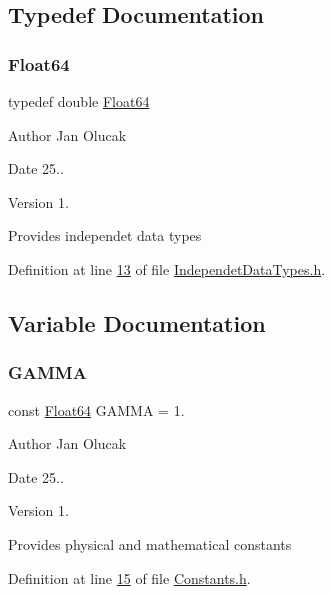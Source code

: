\subsection{Typedef Documentation}
\mbox{\label{group___tools_ga3f1431cb9f76da10f59246d1d743dc2c}} 
\subsubsection{\texorpdfstring{Float64}{Float64}}
{\footnotesize\ttfamily typedef double \hyperlink{group___tools_ga3f1431cb9f76da10f59246d1d743dc2c}{Float64}}

\begin{DoxyAuthor}{Author}
Jan Olucak 
\end{DoxyAuthor}
\begin{DoxyDate}{Date}
25.. 
\end{DoxyDate}
\begin{DoxyVersion}{Version}
1.
\end{DoxyVersion}
Provides independet data types 

Definition at line \hyperlink{_independet_data_types_8h_source_l00013}{13} of file \hyperlink{_independet_data_types_8h_source}{Independet\+Data\+Types.\+h}.



\subsection{Variable Documentation}
\mbox{\label{group___tools_ga6e7b8e4a71fb3f6d37718ac5d614f560}} 
\subsubsection{\texorpdfstring{G\+A\+M\+MA}{GAMMA}}
{\footnotesize\ttfamily const \hyperlink{group___tools_ga3f1431cb9f76da10f59246d1d743dc2c}{Float64} G\+A\+M\+MA = 1.}

\begin{DoxyAuthor}{Author}
Jan Olucak 
\end{DoxyAuthor}
\begin{DoxyDate}{Date}
25.. 
\end{DoxyDate}
\begin{DoxyVersion}{Version}
1.
\end{DoxyVersion}
Provides physical and mathematical constants 

Definition at line \hyperlink{_constants_8h_source_l00015}{15} of file \hyperlink{_constants_8h_source}{Constants.\+h}.

